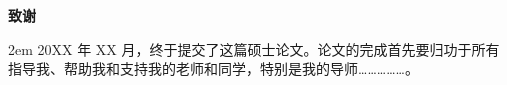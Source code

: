 \clearpage
{}
{}
\begingroup
    \centering
    \heiti\bfseries 致\quad 谢
    \par
    \vspace{\baselineskip}
\endgroup

\begingroup
    \songti
    \setlength{\baselineskip}{\bodylineskip}
    \parindent 2em
    20XX 年 XX 月，终于提交了这篇硕士论文。论文的完成首先要归功于所有指导我、帮助我和支持我的老师和同学，特别是我的导师\dots\dots\dots\dots\dots。
\endgroup

\clearpage
\mbox{}\clearpage 
